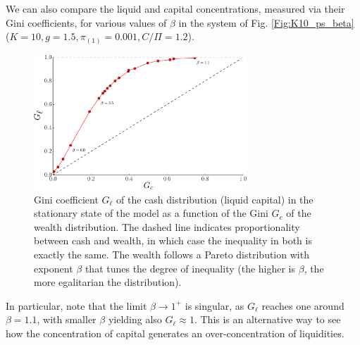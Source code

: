 We can also compare the liquid and capital concentrations, measured via their Gini coefficients, for various values of $\beta$ in the system of Fig. \ref{Fig:K10_ps_beta} ($K=10, g=1.5, \pi_{(1)}=0.001, C/\Pi=1.2$).
\begin{figure}%
\centering
\includegraphics[width=8cm]{figs_ineq/gini_intro.pdf}
\caption{Gini coefficient $G_\ell$ of the cash distribution (liquid capital) in the stationary state of the model as a function of the Gini $G_c$ of the wealth distribution. The dashed line indicates proportionality between cash and wealth, in which case the inequality in both is exactly the same.
The wealth follows a Pareto distribution with exponent $\beta$ that tunes the degree of inequality (the higher is $\beta$, the more egalitarian the distribution).} 
\label{Fig:Gini_Intro}
\end{figure}
In particular, note that the limit $\beta\to 1^+$ is singular, as $G_\ell$ reaches one around $\beta=1.1$, with smaller $\beta$ yielding also $G_\ell\approx 1$.
This is an alternative way to see how the concentration of capital generates an over-concentration of liquidities.

